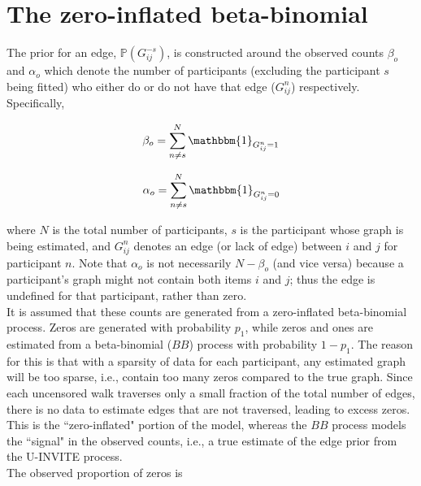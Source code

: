 \documentclass[12pt]{article}
\begin{document}
\maketitle

\section{The zero-inflated beta-binomial}

The prior for an edge, $\mathbb{P}(G^{-s}_{ij})$, is constructed around the observed counts $\beta_o$ and $\alpha_o$ which denote the number of participants (excluding the participant $s$ being fitted) who either do or do not have that edge ($G^n_{ij}$) respectively. Specifically,

\begin{equation}
    \beta_o = \sum_{n \neq s}^N \mathbbm{1}_{G^n_{ij}=1}
\end{equation}

\begin{equation}
    \alpha_o = \sum_{n \neq s}^N \mathbbm{1}_{G^n_{ij}=0}
\end{equation}

\noindent
where $N$ is the total number of participants, $s$ is the participant whose graph is being estimated, and $G^n_{ij}$ denotes an edge (or lack of edge) between $i$ and $j$ for participant $n$. Note that $\alpha_o$ is not necessarily $N - \beta_o$ (and vice versa) because a participant's graph might not contain both items $i$ and $j$;  thus the edge is undefined for that participant, rather than zero. \\

It is assumed that these counts are generated from a zero-inflated beta-binomial process. Zeros are generated with probability $p_1$, while zeros and ones are estimated from a beta-binomial ($BB$) process with probability $1 - p_1$. The reason for this is that with a sparsity of data for each participant, any estimated graph will be too sparse, i.e., contain too many zeros compared to the true graph. Since each uncensored walk traverses only a small fraction of the total number of edges, there is no data to estimate edges that are not traversed, leading to excess zeros. This is the ``zero-inflated" portion of the model, whereas the $BB$ process models the ``signal" in the observed counts, i.e., a true estimate of the edge prior from the U-INVITE process. \\

The observed proportion of zeros is
\end{document}
